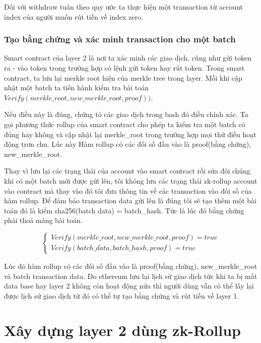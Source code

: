 \documentclass[../thesis.tex]{subfiles}
\begin{document}
Đối với withdraw tuân theo quy ước ta thực hiện một transaction từ account index của người muốn rút tiền về index zero. 

\subsubsection{Tạo bằng chứng và xác minh transaction cho một batch}
Smart contract của layer 2 là nơi ta xác minh các giao dịch, cũng như gửi token ra - vào token trong trường hợp có lệnh gửi token hay rút token. Trong smart contract, ta lưu lại merkle root hiện của merkle tree trong layer. Mỗi khi cập nhật một batch ta tiến hành kiểm tra bài toán $Verify(merkle\_root,new\_merkle\_root, proof))$.


Nếu điều này là đúng, chứng tỏ các giao dịch trong bash đó điều chính xác. Ta gọi phương thức rollup của smart contract cho phép ta kiểm tra một batch có đúng hay không và cập nhật lại merkle\_root trong trường hợp mọi thứ điều hoạt động trơn chu. Lúc này Hàm rollup có các đối số đầu vào là proof(bằng chứng), new\_merkle\_root.

Thay vì lưu lại các trạng thái của account vào smart contract rồi sửa đôi chúng khi có một batch mới được gửi lên, tôi không lưu các trạng thái zk-rollup account vào contract  mà thay vào đó tôi đưa thông tin về các transaction vào đối số của hàm rollup. Để đảm bảo transaction data gửi lên là đúng tôi sẽ tạo thêm một bài toán đó là kiểm sha256(batch data) = batch\_hash. Tức là lúc đó bằng chứng phải thoả mãng bài toán.

\[
\begin{cases}
  Verify(merkle\_root,new\_merkle\_root, proof) = true \\
 	Verify(batch\_data, batch\_hash, proof) = true
\end{cases}
\]

Lúc đó hàm rollup có các đối số đầu vào là proof(bằng chứng), new\_merkle\_root và batch transaction data. Do ethereum lưu lại lịch sử giao dịch tức khi ta bị mất data base hay layer 2 không còn hoạt động nửa thì người dùng vẫn có thể lấy lại được lịch sử giao dịch từ đó có thể tự tạo bằng chứng và rút tiền về layer 1.

\section{Xây dựng layer 2 dùng zk-Rollup}
\end{document}
